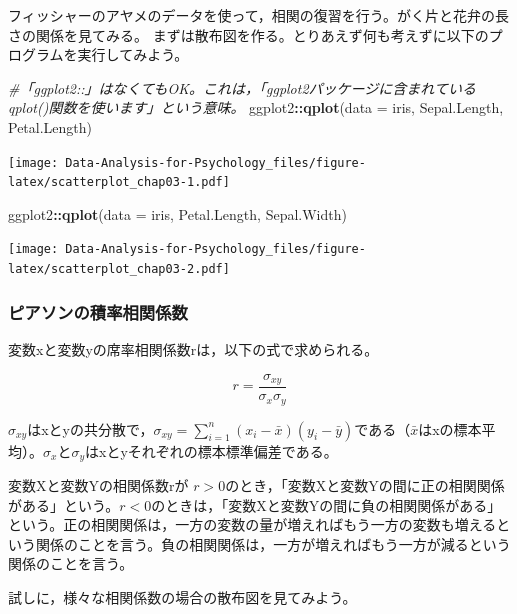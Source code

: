 \documentclass[]{article}
\newenvironment{Shaded}{\begin{snugshade}}{\end{snugshade}}
\newcommand{\KeywordTok}[1]{\textcolor[rgb]{0.13,0.29,0.53}{\textbf{#1}}}
\newcommand{\DataTypeTok}[1]{\textcolor[rgb]{0.13,0.29,0.53}{#1}}
\newcommand{\CommentTok}[1]{\textcolor[rgb]{0.56,0.35,0.01}{\textit{#1}}}
\newcommand{\OperatorTok}[1]{\textcolor[rgb]{0.81,0.36,0.00}{\textbf{#1}}}
\newcommand{\NormalTok}[1]{#1}
\begin{document}
フィッシャーのアヤメのデータを使って，相関の復習を行う。がく片と花弁の長さの関係を見てみる。
まずは散布図を作る。とりあえず何も考えずに以下のプログラムを実行してみよう。

\begin{Shaded}
\begin{Highlighting}[]
\CommentTok{#「ggplot2::」はなくてもOK。これは，「ggplot2パッケージに含まれているqplot()関数を使います」という意味。}
\NormalTok{ggplot2}\OperatorTok{::}\KeywordTok{qplot}\NormalTok{(}\DataTypeTok{data =}\NormalTok{ iris, Sepal.Length, Petal.Length)}
\end{Highlighting}
\end{Shaded}

\texttt{[image: Data-Analysis-for-Psychology\_files/figure-latex/scatterplot\_chap03-1.pdf]}

\begin{Shaded}
\begin{Highlighting}[]
\NormalTok{ggplot2}\OperatorTok{::}\KeywordTok{qplot}\NormalTok{(}\DataTypeTok{data =}\NormalTok{ iris, Petal.Length, Sepal.Width)}
\end{Highlighting}
\end{Shaded}

\texttt{[image: Data-Analysis-for-Psychology\_files/figure-latex/scatterplot\_chap03-2.pdf]}

\subsubsection{ピアソンの積率相関係数}

変数xと変数yの席率相関係数rは，以下の式で求められる。

\[
r = \frac{\sigma_{xy}}{\sigma_{x}\sigma_{y}}
\]

\(\sigma_{xy}\)はxとyの共分散で，\(\sigma_{xy} = \sum^n_{i=1}(x_{i}-\bar{x})(y_{i}-\bar{y})\)である（\(\bar{x}\)はxの標本平均）。\(\sigma_{x}\)と\(\sigma_{y}\)はxとyそれぞれの標本標準偏差である。

変数Xと変数Yの相関係数rが
\(r > 0\)のとき，「変数Xと変数Yの間に正の相関関係がある」という。\(r < 0\)のときは，「変数Xと変数Yの間に負の相関関係がある」という。正の相関関係は，一方の変数の量が増えればもう一方の変数も増えるという関係のことを言う。負の相関関係は，一方が増えればもう一方が減るという関係のことを言う。

試しに，様々な相関係数の場合の散布図を見てみよう。
\end{document}
